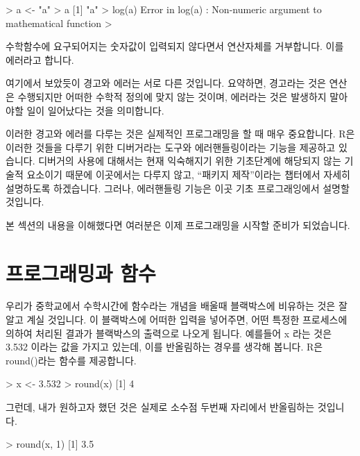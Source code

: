 \begin{Schunk}
\begin{Soutput}
> a <- "a"
> a
[1] "a"
> log(a)
Error in log(a) : Non-numeric argument to mathematical function
> 
\end{Soutput}
\end{Schunk}

수학함수에 요구되어지는 숫자값이 입력되지 않다면서 연산자체를 거부합니다. 
이를 에러라고 합니다. 

여기에서 보았듯이 경고와 에러는 서로 다른 것입니다.
요약하면, 경고라는 것은 연산은 수행되지만 어떠한 수학적 정의에 맞지 않는 것이며, 에러라는 것은 발생하지 말아야할 일이 일어났다는 것을 의미합니다. 

이러한 경고와 에러를 다루는 것은 실제적인 프로그래밍을 할 때 매우 중요합니다. 
R은 이러한 것들을 다루기 위한 디버거라는 도구와 에러핸들링이라는 기능을 제공하고 있습니다.
디버거의 사용에 대해서는 현재 익숙해지기 위한 기초단계에 해당되지 않는 기술적 요소이기 때문에 이곳에서는 다루지 않고, 
``패키지 제작''이라는 챕터에서 자세히 설명하도록 하겠습니다. 
그러나, 에러핸들링 기능은 이곳 기초 프로그래잉에서 설명할 것입니다. 

본 섹션의 내용을 이해했다면 여러분은 이제 프로그래밍을 시작할 준비가 되었습니다. 

\section{프로그래밍과 함수}

우리가 중학교에서 수학시간에 함수라는 개념을 배울때 블랙박스에 비유하는 것은 잘 알고 계실 것입니다. 
이 블랙박스에 어떠한 입력을 넣어주면, 어떤 특정한 프로세스에 의하여 처리된 결과가 블랙박스의 출력으로 나오게 됩니다. 
예를들어 x 라는 것은 3.532 이라는 값을 가지고 있는데, 이를 반올림하는 경우를 생각해 봅니다.
R은 round()라는 함수를 제공합니다. 

\begin{Schunk}
\begin{Soutput}
> x <- 3.532
> round(x)
[1] 4
\end{Soutput}
\end{Schunk}

그런데, 내가 원하고자 했던 것은 실제로 소수점 두번째 자리에서 반올림하는 것입니다. 

\begin{Schunk}
\begin{Soutput}
> round(x, 1)
[1] 3.5
\end{Soutput}
\end{Schunk}

